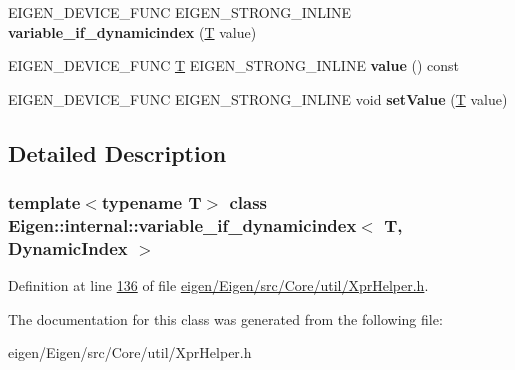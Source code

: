 \begin{DoxyCompactItemize}
E\+I\+G\+E\+N\+\_\+\+D\+E\+V\+I\+C\+E\+\_\+\+F\+U\+NC E\+I\+G\+E\+N\+\_\+\+S\+T\+R\+O\+N\+G\+\_\+\+I\+N\+L\+I\+NE {\bfseries variable\+\_\+if\+\_\+dynamicindex} (\hyperlink{group___sparse_core___module}{T} value)
\item 
\mbox{\label{class_eigen_1_1internal_1_1variable__if__dynamicindex_3_01_t_00_01_dynamic_index_01_4_a355b9b89ad0e85e71e392a015c9e9fca}} 
E\+I\+G\+E\+N\+\_\+\+D\+E\+V\+I\+C\+E\+\_\+\+F\+U\+NC \hyperlink{group___sparse_core___module}{T} E\+I\+G\+E\+N\+\_\+\+S\+T\+R\+O\+N\+G\+\_\+\+I\+N\+L\+I\+NE {\bfseries value} () const
\item 
\mbox{\label{class_eigen_1_1internal_1_1variable__if__dynamicindex_3_01_t_00_01_dynamic_index_01_4_a486ec15d3596b14d8cab8da5aed14eea}} 
E\+I\+G\+E\+N\+\_\+\+D\+E\+V\+I\+C\+E\+\_\+\+F\+U\+NC E\+I\+G\+E\+N\+\_\+\+S\+T\+R\+O\+N\+G\+\_\+\+I\+N\+L\+I\+NE void {\bfseries set\+Value} (\hyperlink{group___sparse_core___module}{T} value)
\end{DoxyCompactItemize}


\subsection{Detailed Description}
\subsubsection*{template$<$typename T$>$\newline
class Eigen\+::internal\+::variable\+\_\+if\+\_\+dynamicindex$<$ T, Dynamic\+Index $>$}



Definition at line \hyperlink{eigen_2_eigen_2src_2_core_2util_2_xpr_helper_8h_source_l00136}{136} of file \hyperlink{eigen_2_eigen_2src_2_core_2util_2_xpr_helper_8h_source}{eigen/\+Eigen/src/\+Core/util/\+Xpr\+Helper.\+h}.



The documentation for this class was generated from the following file\+:\begin{DoxyCompactItemize}
\item 
eigen/\+Eigen/src/\+Core/util/\+Xpr\+Helper.\+h\end{DoxyCompactItemize}

